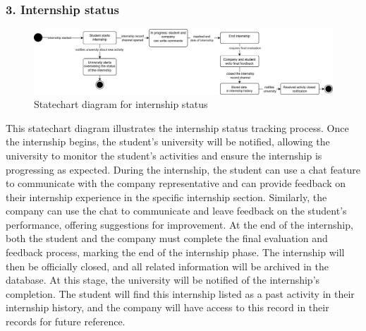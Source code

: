 \subsubsection{3. Internship status}\label{subsubsec:monitoring_student_activities}
\begin{figure}[H]
    \centering
    \includegraphics[width=1\textwidth]{Images/Statecharts/Internship_status.png}
    \caption{Statechart diagram for internship status}\label{fig:statechart_internship_status}
\end{figure}
This statechart diagram illustrates the internship status tracking process. Once the internship begins, the student’s university will be notified, 
allowing the university to monitor the student’s activities and ensure the internship is progressing as expected.
During the internship, the student can use a chat feature to communicate with the company representative and can provide feedback on their internship experience 
in the specific internship section. Similarly, the company can use the chat to communicate and leave feedback on the student’s performance, offering suggestions
for improvement.
At the end of the internship, both the student and the company must complete the final evaluation and feedback process, marking the end of the internship phase.
The internship will then be officially closed, and all related information will be archived in the database. At this stage, the university will be notified
of the internship’s completion.
The student will find this internship listed as a past activity in their internship history, and the company will have access to this record in their records
 for future reference.

